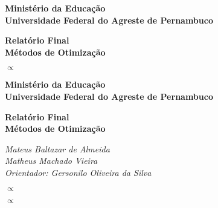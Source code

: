 

\thispagestyle{empty}


\begin{center}
{\huge \textbf{Ministério da Educação}} \\
{\huge \textbf{Universidade Federal do Agreste de Pernambuco}}
\end{center}

\vspace {8cm}

\begin{center}
{\huge \textbf{Relatório Final}} \\
{\huge \textbf{Métodos de Otimização}}
\end{center}




\newpage

\thispagestyle{empty}

\begin{center}
$\propto$
\end{center}




\newpage

\thispagestyle{empty}



\begin{center}
{\huge \textbf{Ministério da Educação}} \\
{\huge \textbf{Universidade Federal do Agreste de Pernambuco}}
\end{center}

\vspace{6cm}

\begin{center}
{\huge \textbf{Relatório Final}} \\
{\huge \textbf{Métodos de Otimização}}
\end{center}

\vspace{5cm}

\begin{center}
{\Large\textit{Mateus Baltazar de Almeida}} \\
{\Large\textit{Matheus Machado Vieira}} \\
{\Large\textit{Orientador: Gersonilo Oliveira da Silva}}
\end{center}


\newpage

\newpage


\thispagestyle{empty}

\begin{center}
$\propto$
\end{center}

\newpage


\thispagestyle{empty}

\begin{center}
$\propto$
\end{center}
